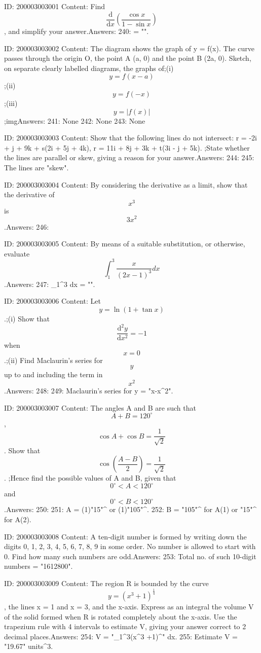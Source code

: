 \documentclass{article}
\begin{document}
ID: 200003003001
Content:
Find \[\frac{\mathrm{d} }{\mathrm{d} x} (\frac {\cos x}{1 - \sin x})\], and simplify your answer.Answers:
240:   = "".

ID: 200003003002
Content:
The diagram shows the graph of y = f(x). The curve passes through the origin O, the point A (a, 0) and the point B (2a, 0). Sketch, on separate clearly labelled diagrams, the graphs of;(i) $$y = f(x-a)$$;(ii) $$y = f(-x)$$;(iii) $$y = |f(x)|$$;imgAnswers:
241: None
242: None
243: None

ID: 200003003003
Content:
Show that the following lines do not intersect: r = -2i + j + 9k + s(2i + 5j + 4k), r = 11i + 8j + 3k + t(3i - j + 5k). ;State whether the lines are parallel or skew, giving a reason for your answer.Answers:
244: 
245: The lines are "skew".

ID: 200003003004
Content:
By considering the derivative as a limit, show that the derivative of \[x^3\] is \[3x^2\].Answers:
246: 

ID: 200003003005
Content:
By means of a suitable substitution, or otherwise, evaluate \[\int_{1}^{3} \frac{x}{(2x-1)^3} dx\].Answers:
247: \int_1^3  dx = "".

ID: 200003003006
Content:
Let \[y = \ln (1 + \tan x)\].;(i) Show that \[\frac{\mathrm{d}^2 y}{\mathrm{d} x^2} = -1\] when $$x = 0$$.;(ii) Find Maclaurin's series for $$y$$ up to and including the term in \[x^2\].Answers:
248: 
249: Maclaurin's series for y = "x-x^2".

ID: 200003003007
Content:
The angles A and B are such that \[A + B = 120^{\circ}\], \[\cos A + \cos B = \frac{1}{\sqrt{2}}\]. Show that \[\cos (\frac{A - B}{2}) = \frac{1}{\sqrt{2}}\]. ;Hence find the possible values of A and B, given that \[0^{\circ} < A < 120^{\circ}\] and \[0^{\circ} < B < 120^{\circ}\].Answers:
250: 
251: A = (1)"15"^{\circ} or (1)"105"^{\circ}.
252: B = "105"^{\circ} for A(1) or "15"^{\circ} for A(2).

ID: 200003003008
Content:
A ten-digit number is formed by writing down the digits 0, 1, 2, 3, 4, 5, 6, 7, 8, 9 in some order. No number is allowed to start with 0. Find how many such numbers are odd.Answers:
253: Total no. of such 10-digit numbers = "1612800".

ID: 200003003009
Content:
The region R is bounded by the curve \[y = (x^3 + 1)^{\frac{1}{4}}\], the lines x = 1 and x = 3, and the x-axis. Express as an integral the volume V of the solid formed when R is rotated completely about the x-axis. Use the trapezium rule with 4 intervals to estimate V, giving your answer correct to 2 decimal places.Answers:
254: V = "\pi\int_1^3(x^3 +1)^{}" dx.
255: Estimate V = "19.67" units^3.
\end{document}
